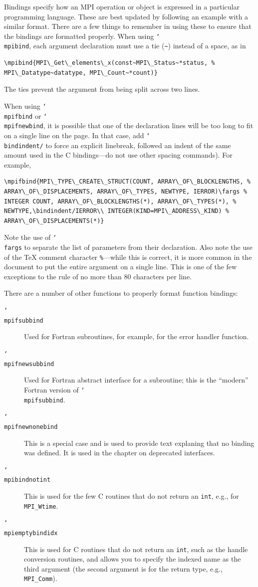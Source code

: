 \documentclass[letterpaper,twoside,11pt,fleqn]{article}
\def\cmd#1{\texttt{\char`\\#1}}
\def\MPI/{\textsf{MPI}}    %
\begin{document}
Bindings specify how an \MPI/ operation or object is expressed in a
particular programming language.  These are best updated by following
an example with a similar format.  There are a few things to remember
in using these to ensure that the bindings are formatted properly.
When using \cmd{mpibind}, each argument declaration must use a tie
(\verb+~+) instead of a space, as in
\begin{verbatim}
\mpibind{MPI\_Get\_elements\_x(const~MPI\_Status~*status, %
MPI\_Datatype~datatype, MPI\_Count~*count)}
\end{verbatim}
The ties prevent the argument from being split across two lines.

When using \cmd{mpifbind} or \cmd{mpifnewbind}, it is possible
that one of the declaration lines will be too long to fit on a single
line on the page.  In that case, add \cmd{bindindent/} to force an
explicit linebreak, followed an indent of the same amount used in the
C bindings---do not
use other spacing commands).  For example,
\begin{small}
\begin{verbatim}
\mpifbind{MPI\_TYPE\_CREATE\_STRUCT(COUNT, ARRAY\_OF\_BLOCKLENGTHS, %
ARRAY\_OF\_DISPLACEMENTS, ARRAY\_OF\_TYPES, NEWTYPE, IERROR)\fargs %
INTEGER COUNT, ARRAY\_OF\_BLOCKLENGTHS(*), ARRAY\_OF\_TYPES(*), %
NEWTYPE,\bindindent/IERROR\\ INTEGER(KIND=MPI\_ADDRESS\_KIND) %
ARRAY\_OF\_DISPLACEMENTS(*)}
\end{verbatim}
\end{small}
Note the use of \cmd{fargs} to separate the list of parameters from
their declaration.
Also note the use of the TeX comment character \verb+%+---while this is
correct, it is more common in the document to put the entire argument
on a single line.  This is one of the few exceptions to the rule of no
more than 80 characters per line.

There are a number of other functions to properly format function bindings:
\begin{description}
\item[\cmd{mpifsubbind}]Used for Fortran subroutines, for example, for
  the error handler function.
\item[\cmd{mpifnewsubbind}]Used for Fortran abstract interface for a
  subroutine; this is the ``modern'' Fortran version of
  \cmd{mpifsubbind}.
\item[\cmd{mpifnewnonebind}]This is a special case and is used to
  provide text explaning that no binding was defined.
  It is used in the chapter on deprecated interfaces.
\item[\cmd{mpibindnotint}]This is used for the few C routines that do
  not return an \texttt{int}, e.g., for \texttt{MPI\_Wtime}.
\item[\cmd{mpiemptybindidx}]This is used for C routines that do not
  return an \texttt{int}, such as the handle conversion routines, and
  allows you to specify the indexed name as the third argument (the
  second argument is for the return type, e.g., \texttt{MPI\_Comm}).
\end{description}
\end{document}
